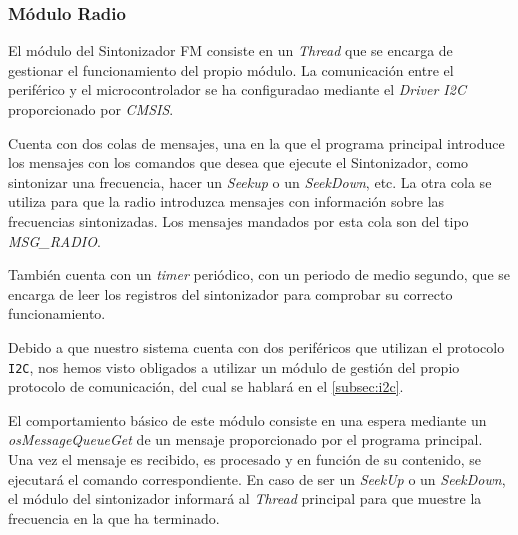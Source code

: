 \subsubsection{Módulo Radio}
El módulo del Sintonizador FM consiste en un \textit{Thread} que se encarga de gestionar el funcionamiento del propio módulo. La comunicación entre el periférico y el microcontrolador se ha configuradao mediante el \textit{Driver I2C} proporcionado por \textit{CMSIS}.

Cuenta con dos colas de mensajes, una en la que el programa principal introduce los mensajes con los comandos que desea que ejecute el Sintonizador, como sintonizar una frecuencia, hacer un \textit{Seekup} o un \textit{SeekDown}, etc. La otra cola se utiliza para que la radio introduzca mensajes con información sobre las frecuencias sintonizadas. Los mensajes mandados por esta cola son del tipo \textit{MSG\_RADIO}.

También cuenta con un \textit{timer} periódico, con un periodo de medio segundo, que se encarga de leer los registros del sintonizador para comprobar su correcto funcionamiento.

Debido a que nuestro sistema cuenta con dos periféricos que utilizan el protocolo \texttt{I2C}, nos hemos visto obligados a utilizar un módulo de gestión del propio protocolo de comunicación, del cual se hablará en el \autoref{subsec:i2c}.

El comportamiento básico de este módulo consiste en una espera mediante un \textit{osMessageQueueGet} de un mensaje proporcionado por el programa principal. Una vez el mensaje es recibido, es procesado y en función de su contenido, se ejecutará el comando correspondiente. En caso de ser un \textit{SeekUp} o un \textit{SeekDown}, el módulo del sintonizador informará al \textit{Thread} principal para que muestre la frecuencia en la que ha terminado.